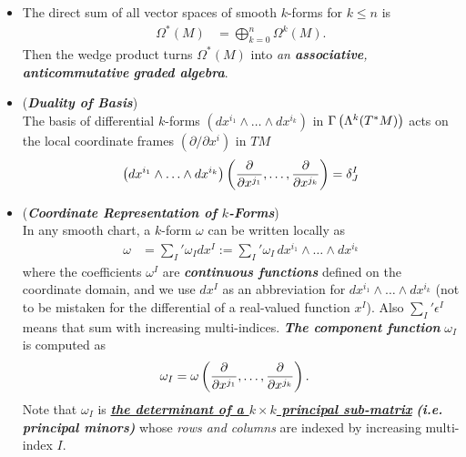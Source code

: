 \documentclass[11pt]{article}
\begin{document}
\begin{itemize}
\item \begin{remark}
The direct sum of all vector spaces of smooth $k$-forms for $k\le n$ is 
\begin{align}
\Omega^{*}(M) &= \bigoplus_{k=0}^{n}\Omega^{k}(M). \label{eqn: grassman_algebra_k_form}
\end{align} Then the wedge product turns $\Omega^{*}(M) $ into \emph{an \textbf{associative}, \textbf{anticommutative} \textbf{graded algebra}}.
\end{remark}

\item \begin{remark}(\emph{\textbf{Duality of Basis}})\\
The basis of differential $k$-forms $(dx^{i_1} \wedge \ldots \wedge dx^{i_k})$ in $\Gamma\left(\Lambda^{k}(T^{*}M)\right)$ acts on the local coordinate frames $(\partial / \partial x^i)$ in $TM$
\begin{align*}
\left(dx^{i_1} \wedge \ldots \wedge dx^{i_k}\right)\left(\frac{\partial }{ \partial x^{j_1}}, \ldots, \frac{\partial }{ \partial x^{j_k}}\right) = \delta_{J}^{I}
\end{align*}  
\end{remark}

\item \begin{remark}(\emph{\textbf{Coordinate Representation of $k$-Forms}})\\
In any smooth chart, a $k$-form $\omega$ can be written locally as
\begin{align*}
\omega &= \sum_{I}'\omega_{I}dx^{I} := \sum_{I}'\omega_{I}\,dx^{i_1} \wedge \ldots \wedge dx^{i_k}
\end{align*} where the coefficients $\omega^{I}$ are \emph{\textbf{continuous functions}} defined on the coordinate domain, and we use $dx^I$ as an abbreviation for $dx^{i_1} \wedge \ldots \wedge dx^{i_k}$ (not to be mistaken for the differential of a real-valued function $x^I$). Also $\sum_{I}'\epsilon^{I}$ means that sum with increasing multi-indices.  \emph{\textbf{The component function}} $\omega_I$ is computed as
\begin{align*}
\omega_{I} &= \omega\left(\frac{\partial }{ \partial x^{j_1}}, \ldots, \frac{\partial }{ \partial x^{j_k}}\right).
\end{align*} Note that $\omega_I$ is \underline{\emph{\textbf{the determinant of a $k \times k$ principal sub-matrix}}} \emph{\textbf{(i.e. principal minors)}} whose \emph{rows and columns} are indexed by increasing multi-index $I$.
\end{remark}


\end{itemize}
\end{document}
